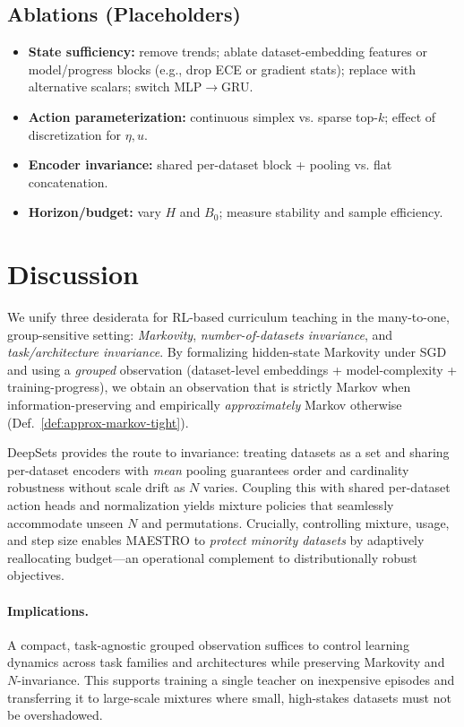 \documentclass[11pt]{article}
\newcommand{\1}{\mathbf{1}}
\newcommand{\MAESTRO}{\textsc{MAESTRO}\xspace}
\begin{document}
\subsection{Ablations (Placeholders)}
\begin{itemize}[leftmargin=1.5em]
\item \textbf{State sufficiency:} remove trends; ablate dataset-embedding features or model/progress blocks (e.g., drop ECE or gradient stats); replace with alternative scalars; switch MLP$\to$GRU.
\item \textbf{Action parameterization:} continuous simplex vs. sparse top-$k$; effect of discretization for $\eta,u$.
\item \textbf{Encoder invariance:} shared per-dataset block + pooling vs. flat concatenation.
\item \textbf{Horizon/budget:} vary $H$ and $B_0$; measure stability and sample efficiency.
\end{itemize}

\section{Discussion}
We unify three desiderata for RL-based curriculum teaching in the many-to-one, group-sensitive setting: \emph{Markovity}, \emph{number-of-datasets invariance}, and \emph{task/architecture invariance}. By formalizing hidden-state Markovity under SGD and using a \emph{grouped} observation (dataset-level embeddings + model-complexity + training-progress), we obtain an observation that is strictly Markov when information-preserving and empirically \emph{approximately} Markov otherwise (Def.~\ref{def:approx-markov-tight}). 

DeepSets provides the route to invariance: treating datasets as a set and sharing per-dataset encoders with \emph{mean} pooling guarantees order and cardinality robustness without scale drift as $N$ varies. Coupling this with shared per-dataset action heads and normalization yields mixture policies that seamlessly accommodate unseen $N$ and permutations. Crucially, controlling mixture, usage, and step size enables \MAESTRO{} to \emph{protect minority datasets} by adaptively reallocating budget—an operational complement to distributionally robust objectives.

\paragraph{Implications.}
A compact, task-agnostic grouped observation suffices to control learning dynamics across task families and architectures while preserving Markovity and $N$-invariance. This supports training a single teacher on inexpensive episodes and transferring it to large-scale mixtures where small, high-stakes datasets must not be overshadowed.
\end{document}
